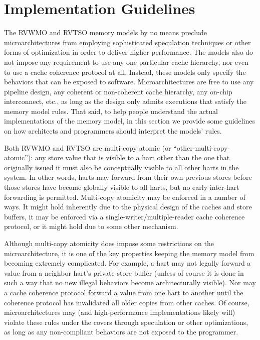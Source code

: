 \section{Implementation Guidelines}

The RVWMO and RVTSO memory models by no means preclude microarchitectures from employing sophisticated speculation techniques or other forms of optimization in order to deliver higher performance.
The models also do not impose any requirement to use any one particular cache hierarchy, nor even to use a cache coherence protocol at all.
Instead, these models only specify the behaviors that can be exposed to software.
Microarchitectures are free to use any pipeline design, any coherent or non-coherent cache hierarchy, any on-chip interconnect, etc., as long as the design only admits executions that satisfy the memory model rules.
That said, to help people understand the actual implementations of the memory model, in this section we provide some guidelines on how architects and programmers should interpret the models' rules.

Both RVWMO and RVTSO are multi-copy atomic (or ``other-multi-copy-atomic''): any store value that is visible to a hart other than the one that originally issued it must also be conceptually visible to all other harts in the system.
In other words, harts may forward from their own previous stores before those stores have become globally visible to all harts, but no early inter-hart forwarding is permitted.
Multi-copy atomicity may be enforced in a number of ways.
It might hold inherently due to the physical design of the caches and store buffers, it may be enforced via a single-writer/multiple-reader cache coherence protocol, or it might hold due to some other mechanism.

Although multi-copy atomicity does impose some restrictions on the microarchitecture, it is one of the key properties keeping the memory model from becoming extremely complicated.
For example, a hart may not legally forward a value from a neighbor hart's private store buffer (unless of course it is done in such a way that no new illegal behaviors become architecturally visible).
Nor may a cache coherence protocol forward a value from one hart to another until the coherence protocol has invalidated all older copies from other caches.
Of course, microarchitectures may (and high-performance implementations likely will) violate these rules under the covers through speculation or other optimizations, as long as any non-compliant behaviors are not exposed to the programmer.

